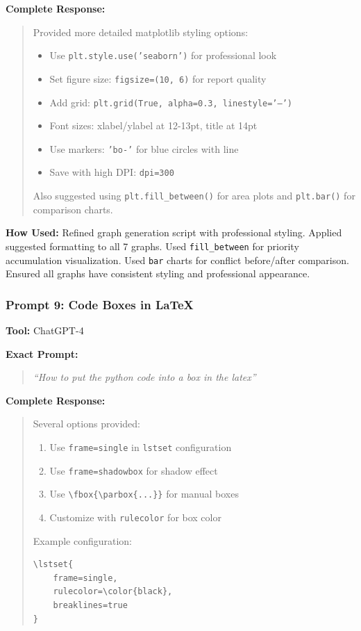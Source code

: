 \documentclass[conference]{IEEEtran}
\begin{document}
\textbf{Complete Response:}
\begin{quote}
\small
Provided more detailed matplotlib styling options:
\begin{itemize}
    \item Use \texttt{plt.style.use('seaborn')} for professional look
    \item Set figure size: \texttt{figsize=(10, 6)} for report quality
    \item Add grid: \texttt{plt.grid(True, alpha=0.3, linestyle='--')}
    \item Font sizes: xlabel/ylabel at 12-13pt, title at 14pt
    \item Use markers: \texttt{'bo-'} for blue circles with line
    \item Save with high DPI: \texttt{dpi=300}
\end{itemize}
Also suggested using \texttt{plt.fill\_between()} for area plots and \texttt{plt.bar()} for comparison charts.
\end{quote}

\textbf{How Used:}
Refined graph generation script with professional styling. Applied suggested formatting to all 7 graphs. Used \texttt{fill\_between} for priority accumulation visualization. Used \texttt{bar} charts for conflict before/after comparison. Ensured all graphs have consistent styling and professional appearance.

\vspace{0.4cm}

\subsubsection{Prompt 9: Code Boxes in LaTeX}

\textbf{Tool:} ChatGPT-4

\textbf{Exact Prompt:}
\begin{quote}
\textit{``How to put the python code into a box in the latex''}
\end{quote}

\textbf{Complete Response:}
\begin{quote}
\small
Several options provided:
\begin{enumerate}
    \item Use \texttt{frame=single} in \texttt{lstset} configuration
    \item Use \texttt{frame=shadowbox} for shadow effect
    \item Use \texttt{\textbackslash fbox\{\textbackslash parbox\{...\}\}} for manual boxes
    \item Customize with \texttt{rulecolor} for box color
\end{enumerate}

Example configuration:
\begin{verbatim}
\lstset{
    frame=single,
    rulecolor=\color{black},
    breaklines=true
}
\end{verbatim}
\end{quote}
\end{document}
